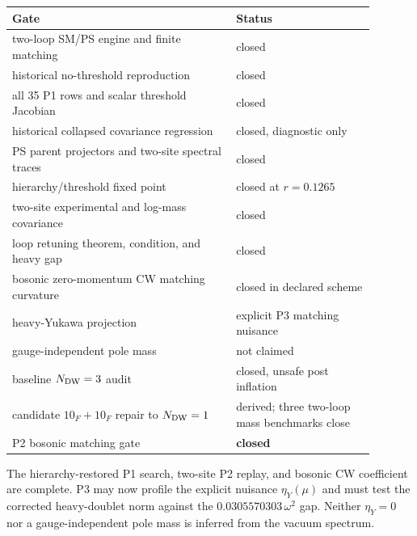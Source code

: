 \documentclass[11pt]{article}
\begin{document}
\begin{center}
\begin{tabular}{@{}>{\raggedright\arraybackslash}p{0.55\linewidth}
                    >{\raggedright\arraybackslash}p{0.34\linewidth}@{}}
\toprule
Gate & Status\\
\midrule
two-loop SM/PS engine and finite matching & closed\\
historical no-threshold reproduction & closed\\
all 35 P1 rows and scalar threshold Jacobian & closed\\
historical collapsed covariance regression & closed, diagnostic only\\
PS parent projectors and two-site spectral traces & closed\\
hierarchy/threshold fixed point & closed at $r=0.1265$\\
two-site experimental and log-mass covariance & closed\\
loop retuning theorem, condition, and heavy gap & closed\\
bosonic zero-momentum CW matching curvature & closed in declared scheme\\
heavy-Yukawa projection & explicit P3 matching nuisance\\
gauge-independent pole mass & not claimed\\
baseline $N_{\rm DW}=3$ audit & closed, unsafe post inflation\\
candidate $10_F+10_F$ repair to $N_{\rm DW}=1$ & derived; three two-loop mass benchmarks close\\
P2 bosonic matching gate & \textbf{closed}\\
\bottomrule
\end{tabular}
\end{center}

The hierarchy-restored P1 search, two-site P2 replay, and bosonic CW
coefficient are complete.  P3 may now profile the explicit nuisance
$\eta_Y(\mu)$ and must test the corrected heavy-doublet norm against the
$0.0305570303\,\omega^2$ gap.  Neither $\eta_Y=0$ nor a gauge-independent
pole mass is inferred from the vacuum spectrum.
\end{document}
